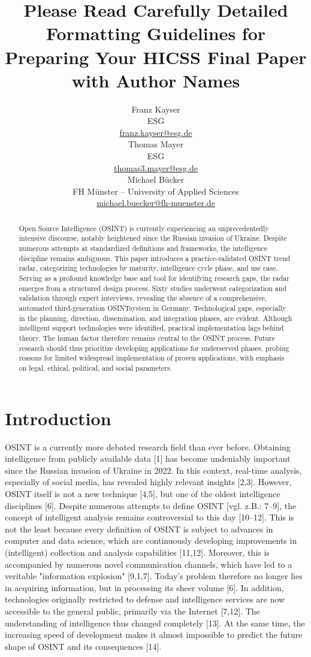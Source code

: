 \documentclass[10pt]{article}
\title{Please Read Carefully Detailed Formatting Guidelines for Preparing Your HICSS Final Paper with Author Names}
\author{Franz Kayser \\
  ESG \\
  {\underline{ franz.kayser@esg.de}} \\\And
  Thomas Mayer \\
  ESG  \\
  {\underline{ thomas3.mayer@esg.de} }\\\And 
  Michael Bücker \\
  FH Münster -- University of Applied Sciences\\
  {\underline{michael.buecker@fh-muenster.de}} \\}
\date{}
\begin{document}
\maketitle
\begin{abstract}
    Open Source Intelligence (OSINT) is currently experiencing an unprecedentedly intensive discourse, notably heightened since the Russian invasion of Ukraine. Despite numerous attempts at standardized definitions and frameworks, the intelligence discipline remains ambiguous. This paper introduces a practice-validated OSINT trend radar, categorizing technologies by maturity, intelligence cycle phase, and use case. Serving as a profound knowledge base and tool for identifying research gaps, the radar emerges from a structured design process. Sixty studies underwent categorization and validation through expert interviews, revealing the absence of a comprehensive, automated third-generation OSINTsystem in Germany. Technological gaps, especially in the planning, direction, dissemination, and integration phases, are evident. Although intelligent support technologies were identified, practical implementation lags behind theory. The human factor therefore remains central to the OSINT process. Future research should thus prioritize developing applications for underserved phases, probing reasons for limited widespread implementation of proven applications, with emphasis on legal, ethical, political, and social parameters.


\end{abstract}

\section{Introduction}

OSINT is a currently more debated research field than ever before. Obtaining intelligence from publicly available data [1] has become undeniably important since the Russian invasion of Ukraine in 2022. In this context, real-time analysis, especially of social media, has revealed highly relevant insights [2,3]. However, OSINT itself is not a new technique [4,5], but one of the oldest intelligence disciplines [6]. Despite numerous attempts to define OSINT [vgl. z.B.: 7–9], the concept of intelligent analysis remains controversial to this day [10–12]. This is not the least because every definition of OSINT is subject to advances in computer and data science, which are continuously developing improvements in (intelligent) collection and analysis capabilities [11,12]. Moreover, this is accompanied by numerous novel communication channels, which have led to a veritable "information explosion" [9,1,7]. Today's problem therefore no longer lies in acquiring information, but in processing its sheer volume [6]. In addition, technologies originally restricted to defense and intelligence services are now accessible to the general public, primarily via the Internet [7,12]. The understanding of intelligence thus changed completely [13]. At the same time, the increasing speed of development makes it almost impossible to predict the future shape of OSINT and its consequences [14].
\end{document}
